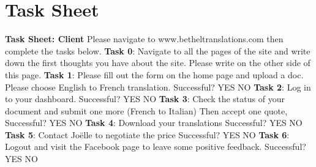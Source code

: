 \documentclass{l3proj}
\begin{document}
\section{Task Sheet}
\label{sect:task-sh}
\textbf{Task Sheet: Client}\newline 
Please navigate to www.betheltranslations.com then complete the tasks below. \newline \newline
\textbf{Task 0}: Navigate to all the pages of the site and write down the first thoughts you have about the site. Please write on the other side of this page. \newline \newline
\textbf{Task 1}: Please fill out the form on the home page and upload a doc. Please choose English to French translation. \newline \newline
Successful?    YES      NO \newline \newline
\textbf{Task 2}: Log in to your dashboard.  \newline \newline
Successful?    YES      NO \newline \newline
\textbf{Task 3}: Check the status of your document and submit one more (French to Italian) Then accept one quote, \newline \newline
Successful?    YES      NO \newline \newline
\textbf{Task 4}: Download your translations \newline \newline
Successful?    YES      NO \newline \newline
\textbf{Task 5}: Contact Jo\"{e}lle to negotiate the price \newline \newline
Successful?    YES      NO \newline \newline
\textbf{Task 6}: Logout and visit the Facebook page to leave some positive feedback. \newline \newline
Successful?    YES      NO \newline \newline
\end{document}
